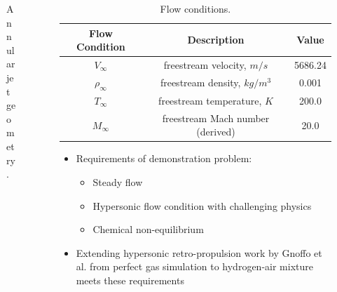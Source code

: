 \documentclass{beamer}
\begin{document}
\begin{frame}
\begin{columns}
\begin{column}{0.4\textwidth}
\begin{figure}
      \caption{Annular jet geometry.}
    \end{figure}
    \end{column}
    \begin{column}{0.65\textwidth}
    \begin{table}[!h]
      \tiny
      \centering
      \begin{tabular}{c|c|c}
        Flow Condition & Description & Value \\
        \hline
        $V_{\infty}$    & freestream velocity, $m/s$        & 5686.24 \\
        $\rho_{\infty}$ & freestream density, $kg/m^3$      & 0.001 \\
        $T_{\infty}$    & freestream temperature, $K$       & 200.0 \\
        $M_{\infty}$    & freestream Mach number (derived)  & 20.0
      \end{tabular}
      \caption{Flow conditions.}
      \label{tab:flow-conditions}
    \end{table}
    \vspace{-0.5cm}
    \small
     \begin{itemize}
       \item Requirements of demonstration problem:
         \begin{itemize}
           \item Steady flow
           \item Hypersonic flow condition with challenging physics
           \item Chemical non-equilibrium
         \end{itemize}
       \item Extending hypersonic retro-propulsion work by Gnoffo et al. from
         perfect gas simulation to hydrogen-air mixture meets these requirements
    \end{itemize}
    \end{column}
  \end{columns}
\end{frame}
\end{document}
